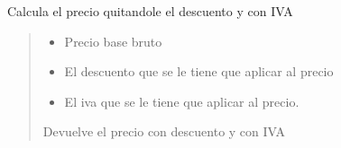 \documentclass[letterpaper,10pt,spanish]{sphinxmanual}
\begin{document}
\begin{fulllineitems}
\label{\detokenize{index:calculadora.calcularPrecioTotal}}
\pysigstartsignatures
\pysiglinewithargsret
{}
{\sphinxparamcomma {}\sphinxparamcomma {}}
{}
\pysigstopsignatures
\sphinxAtStartPar
Calcula el precio quitandole el descuento y con IVA
\begin{quote}\begin{description}
\begin{itemize}
\item {} 
\sphinxAtStartPar
{} \textendash{} Precio base bruto

\item {} 
\sphinxAtStartPar
{} \textendash{} El descuento que se le tiene que aplicar al precio

\item {} 
\sphinxAtStartPar
{} \textendash{} El iva que se le tiene que aplicar al precio.

\end{itemize}

\sphinxAtStartPar
Devuelve el precio con descuento y con IVA

\end{description}\end{quote}

\end{fulllineitems}

\end{document}
